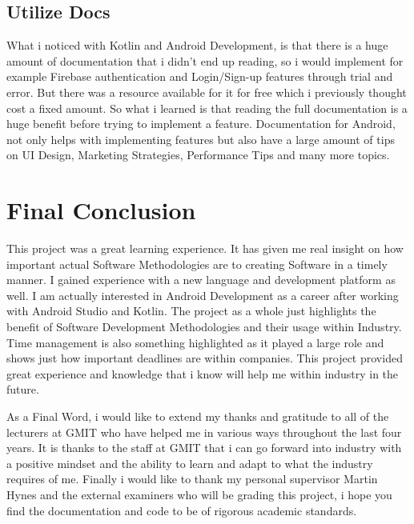 \subsection{Utilize Docs}
What i noticed with Kotlin and Android Development, is that there is a huge amount of documentation that i didn't end up reading, so i would implement for example Firebase authentication and Login/Sign-up features through trial and error. But there was a resource available for it for free which i previously thought cost a fixed amount.
So what i learned is that reading the full documentation is a huge benefit before trying to implement a feature.
Documentation for Android, not only helps with implementing features but also have a large amount of tips on UI Design, Marketing Strategies, Performance Tips and many more topics. 

\bigskip
\newpage
\section{Final Conclusion}
This project was a great learning experience. It has given me real insight on how important actual Software Methodologies are to creating Software in a timely manner. I gained experience with a new language and development platform as well. I am actually interested in Android Development as a career after working with Android Studio and Kotlin. The project as a whole just highlights the benefit of Software Development Methodologies and their usage within Industry. Time management is also something highlighted as it played a large role and shows just how important deadlines are within companies. This project provided great experience and knowledge that i know will help me within industry in the future.\newline

As a Final Word, i would like to extend my thanks and gratitude to all of the lecturers at GMIT who have helped me in various ways throughout the last four years. It is thanks to the staff at GMIT that i can go forward into industry with a positive mindset and the ability to learn and adapt to what the industry requires of me. Finally i would like to thank my personal supervisor Martin Hynes and the external examiners who will be grading this project, i hope you find the documentation and code to be of rigorous academic standards.
\bigskip